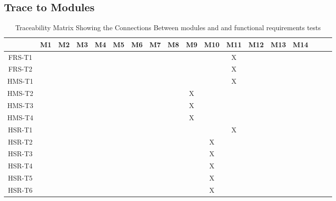 \documentclass[12pt, titlepage]{article}
\begin{document}
\begin{landscape}
\section{Trace to Modules}
\begin{table}[h!]
\centering
\begin{tabular}{|c|c|c|c|c|c|c|c|c|c|c|c|c|c|c|c|c|c|}
\hline
	& M1 & M2 & M3 & M4 & M5 & M6 & M7 & M8 & M9 & M10 & M11 & M12 & M13& M14\\
\hline
FRS-T1        & & & & & & & & & & & X& & & \\ \hline
FRS-T2        & & & & & & & & & & & X& & & \\ \hline
HMS-T1        & & & & & & & & & & & X& & & \\ \hline
HMS-T2        & & & & & & & & & X& & & & & \\ \hline
HMS-T3        & & & & & & & & & X& & & & & \\ \hline
HMS-T4        & & & & & & & & & X& & & & & \\ \hline
HSR-T1        & & & & & & & & & & & X& & & \\ \hline
HSR-T2        & & & & & & & & & & X& & & & \\ \hline
HSR-T3        & & & & & & & & & & X& & & & \\ \hline
HSR-T4        & & & & & & & & & & X& & & & \\ \hline
HSR-T5        & & & & & & & & & & X& & & & \\ \hline
HSR-T6        & & & & & & & & & & X& & & & \\ \hline
\end{tabular}
\caption{Traceability Matrix Showing the Connections Between modules and  and functional requirements tests}
\label{Table:A_trace}
\end{table}
\end{landscape}
\end{document}
